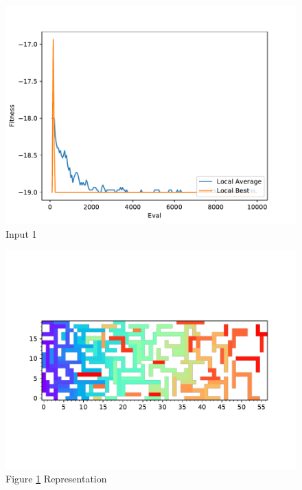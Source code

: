 \documentclass{standalone}
\begin{document}
\begin{figure}[!htb]
	\caption{Input 1}
	\label{fig:graph_1011}
	\includegraphics[width=\textwidth]{../graphs/graphs/1011.pdf}
\end{figure}


\begin{figure}[!htb]
	\caption{Figure \ref{fig:graph_1011} Representation}
	\label{fig:picture_1011}
	\includegraphics[width=\textwidth]{../graphs/picture/1011.pdf}
\end{figure}
\end{document}
